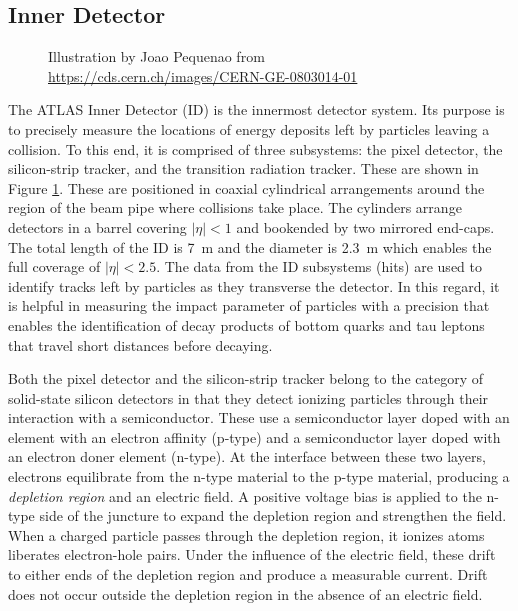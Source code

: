 \subsection{Inner Detector}

\begin{figure}[h!]
\captionsetup[subfigure]{position=b}
\centering
{}
\caption{Illustration by Joao Pequenao from \url{https://cds.cern.ch/images/CERN-GE-0803014-01}}
\label{fig:atlasId}
\end{figure}

The ATLAS Inner Detector (ID) is the innermost detector system.
Its purpose is to precisely measure the locations of energy deposits left by particles leaving a collision.
To this end, it is comprised of three subsystems: the pixel detector, the silicon-strip tracker, and the transition radiation tracker.
These are shown in Figure \ref{fig:atlasId}.
These are positioned in coaxial cylindrical arrangements around the region of the beam pipe where collisions take place.
The cylinders arrange detectors in a barrel covering $|\eta|<1$ and bookended by two mirrored end-caps.
The total length of the ID is 7~m and the diameter is 2.3~m which enables the full coverage of $|\eta|<2.5$.
The data from the ID subsystems (hits) are used to identify tracks left by particles as they transverse the detector.
In this regard, it is helpful in measuring the impact parameter of particles with a precision that enables the identification of decay products of bottom quarks and tau leptons that travel short distances before decaying.
\cite{pixel}

Both the pixel detector and the silicon-strip tracker belong to the category of solid-state silicon detectors in that they detect ionizing particles through their interaction with a semiconductor.
These use a semiconductor layer doped with an element with an electron affinity (p-type) and a semiconductor layer doped with an electron doner element (n-type).
At the interface between these two layers, electrons equilibrate from the n-type material to the p-type material, producing a \emph{depletion region} and an electric field.
A positive voltage bias is applied to the n-type side of the juncture to expand the depletion region and strengthen the field.
When a charged particle passes through the depletion region, it ionizes atoms liberates electron-hole pairs.
Under the influence of the electric field, these drift to either ends of the depletion region and produce a measurable current.
Drift does not occur outside the depletion region in the absence of an electric field. \cite{grupen}

